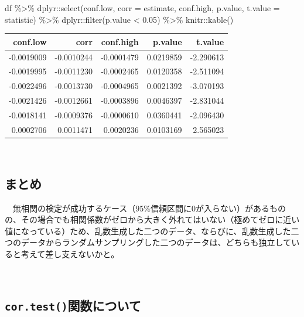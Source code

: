 \documentclass[]{tufte-handout}
\newenvironment{Shaded}{}{}
\newcommand{\AttributeTok}[1]{\textcolor[rgb]{0.49,0.56,0.16}{#1}}
\newcommand{\FloatTok}[1]{\textcolor[rgb]{0.25,0.63,0.44}{#1}}
\newcommand{\FunctionTok}[1]{\textcolor[rgb]{0.02,0.16,0.49}{#1}}
\newcommand{\NormalTok}[1]{#1}
\newcommand{\SpecialCharTok}[1]{\textcolor[rgb]{0.25,0.44,0.63}{#1}}
\begin{document}
\begin{Shaded}
\begin{Highlighting}[numbers=left,,]
\NormalTok{df }\SpecialCharTok{\%\textgreater{}\%} 
\NormalTok{  dplyr}\SpecialCharTok{::}\FunctionTok{select}\NormalTok{(conf.low, }\AttributeTok{corr =}\NormalTok{ estimate, conf.high,}
\NormalTok{                p.value, }\AttributeTok{t.value =}\NormalTok{ statistic) }\SpecialCharTok{\%\textgreater{}\%} 
\NormalTok{  dplyr}\SpecialCharTok{::}\FunctionTok{filter}\NormalTok{(p.value }\SpecialCharTok{\textless{}} \FloatTok{0.05}\NormalTok{) }\SpecialCharTok{\%\textgreater{}\%} 
\NormalTok{  knitr}\SpecialCharTok{::}\FunctionTok{kable}\NormalTok{()}
\end{Highlighting}
\end{Shaded}

\begin{longtable}[]{@{}rrrrr@{}}
\toprule
conf.low & corr & conf.high & p.value & t.value \\
\midrule
\endhead
-0.0019009 & -0.0010244 & -0.0001479 & 0.0219859 & -2.290613 \\
-0.0019995 & -0.0011230 & -0.0002465 & 0.0120358 & -2.511094 \\
-0.0022496 & -0.0013730 & -0.0004965 & 0.0021392 & -3.070193 \\
-0.0021426 & -0.0012661 & -0.0003896 & 0.0046397 & -2.831044 \\
-0.0018141 & -0.0009376 & -0.0000610 & 0.0360441 & -2.096430 \\
0.0002706 & 0.0011471 & 0.0020236 & 0.0103169 & 2.565023 \\
\bottomrule
\end{longtable}

　

\hypertarget{ux307eux3068ux3081}{%
\subsection{まとめ}\label{ux307eux3068ux3081}}

　無相関の検定が成功するケース（\(95\%\)信頼区間に\(0\)が入らない）があるものの、その場合でも相関係数がゼロから大きく外れてはいない（極めてゼロに近い値になっている）ため、乱数生成した二つのデータ、ならびに、乱数生成した二つのデータからランダムサンプリングした二つのデータは、どちらも独立していると考えて差し支えないかと。

　

\hypertarget{cor.testux95a2ux6570ux306bux3064ux3044ux3066}{%
\subsection{\texorpdfstring{\texttt{cor.test()}関数について}{cor.test()関数について}}\label{cor.testux95a2ux6570ux306bux3064ux3044ux3066}}
\end{document}

